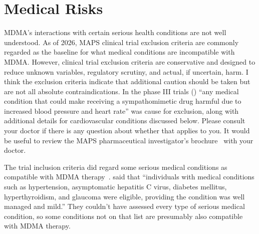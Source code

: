 \documentclass[11pt,oneside]{book}
\let\cite\parencite
\begin{document}
\section{Medical Risks}
\label{medical}
MDMA's interactions with certain serious health conditions are not well understood. As of 2026, MAPS clinical trial exclusion criteria are commonly regarded as the baseline for what medical conditions are incompatible with MDMA. However, clinical trial exclusion criteria are conservative and designed to reduce unknown variables, regulatory scrutiny, and actual, if uncertain, harm. I think the exclusion criteria indicate that additional caution should be taken but are not all absolute contraindications. In the phase III trials (\textcite[Supplementary Information; p. 5]{mitchellMDMAClinicalTrial2}) \enquote{any medical condition that could make receiving a sympathomimetic drug harmful due to increased blood pressure and heart rate} was cause for exclusion, along with additional details for cardiovascular conditions discussed below. Please consult your doctor if there is any question about whether that applies to you. It would be useful to review the MAPS pharmaceutical investigator's brochure~\cite{mapsInvestigatorBrochure} with your doctor.

The trial inclusion criteria did regard some serious medical conditions as compatible with MDMA therapy~\cite{mitchellMDMAClinicalTrial2}. \textcite[Supplementary Information; p. 5]{mitchellMDMAClinicalTrial2} said that \enquote{individuals with medical conditions such as hypertension, asymptomatic hepatitis C virus, diabetes mellitus, hyperthyroidism, and glaucoma were eligible, providing the condition was well managed and mild.} They couldn't have assessed every type of serious medical condition, so some conditions not on that list are presumably also compatible with MDMA therapy.
\end{document}
